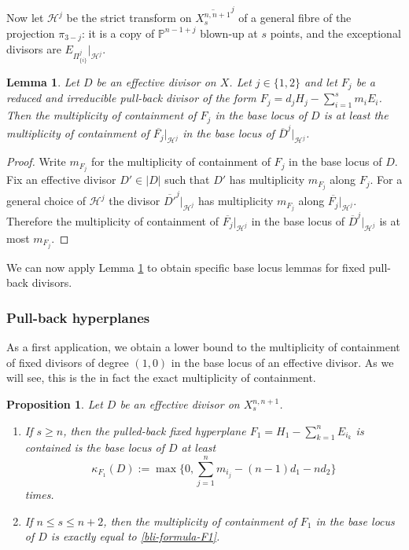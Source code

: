 \documentclass[a4paper,11pt]{article}
\newtheorem{lemma}[theorem]{Lemma}
\newtheorem{proposition}[theorem]{Proposition}
\newcommand{\PP}{\mathbb P}
\begin{document}
Now let $\mathcal{H}^{j}$ be the strict transform on $\overline{X^{n,n+1}_{s}}^j$ of a general fibre of the projection $\pi_{3-j}$: it is a copy of $\PP^{n-1+j}$ blown-up at $s$ points, and the exceptional divisors are $E_{\Pi^j_{\{i\}}}|_{\mathcal{H}^{j}}$.

\begin{lemma}\label{bli for pullbacks}
Let $D$ be an effective divisor on $X$. Let $j\in\{1,2\}$ and let $F_j$ be a reduced and irreducible pull-back divisor of the form $F_j=d_jH_j-\sum_{i=1}^sm_iE_i$. Then the multiplicity of containment of $F_j$ in the base locus of $D$ is at least the multiplicity of containment of $\overline{F_j}|_{\mathcal{H}^j}$ in the base locus of $\overline{D}^j|_{\mathcal{H}^j}$.

\end{lemma}
\begin{proof}
Write $m_{F_j}$ for the multiplicity of containment of $F_j$ in the base locus of $D$. Fix an effective divisor $D' \in |D|$ such that $D'$ has multiplicity $m_{F_j}$ along $F_j$. For a general choice of $\mathcal{H}^j$ the divisor $\overline{D'}^j|_{\mathcal{H}^j}$ has multiplicity $m_{F_j}$ along $\overline{F_j}|_{\mathcal{H}^j}$. Therefore the multiplicity of containment of $\overline{F_j}|_{\mathcal{H}^j}$ in the base locus of $\overline{D}^j|_{\mathcal{H}^j}$ is at most $m_{F_j}$.
\end{proof}

We can now apply Lemma \ref{bli for pullbacks} to obtain specific base locus lemmas for fixed pull-back divisors.

\subsubsection{Pull-back hyperplanes}
As a first application,  we obtain a lower bound to the multiplicity of containment of fixed divisors of degree $(1,0)$ in the base locus of an effective divisor. As we will see, this is the in fact the exact multiplicity of containment.

\begin{proposition}\label{BLI pulledback hyperplanes}
Let $D$ be an effective divisor on $X^{n,n+1}_s$.
\begin{enumerate}
 \item[(a)]
 If $s\ge n$, then the  pulled-back fixed hyperplane $F_1=H_1-\sum_{k=1}^nE_{i_k}$ is contained is the base locus of $D$ at least 
 \begin{equation}\label{bli-formula-F1}
\kappa_{F_1}(D):=\max\{0,\sum_{j=1}^n m_{i_j}-(n-1)d_1-nd_2\}
 \end{equation}
 times. 

 \item[(b)]
If $n\le s\le n+2$, then the multiplicity of containment of $F_1$ in the base locus of $D$ is exactly equal to \eqref{bli-formula-F1}.
\end{enumerate}
 \end{proposition}
\end{document}
